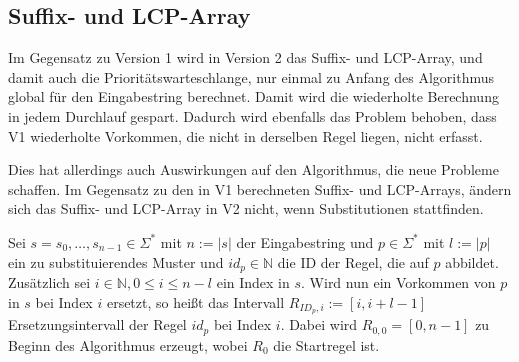 \subsection{Suffix- und LCP-Array}
Im Gegensatz zu Version 1 wird in Version 2 das Suffix- und LCP-Array, und damit auch die Prioritätswarteschlange, nur einmal zu Anfang des Algorithmus global für den Eingabestring berechnet. Damit wird die wiederholte Berechnung in jedem Durchlauf gespart. 
Dadurch wird ebenfalls das Problem behoben, dass V1 wiederholte Vorkommen, die nicht in derselben Regel liegen, nicht erfasst.

Dies hat allerdings auch Auswirkungen auf den Algorithmus, die neue Probleme schaffen. Im Gegensatz zu den in V1 berechneten Suffix- und LCP-Arrays, ändern sich das Suffix- und LCP-Array in V2 nicht, wenn Substitutionen stattfinden. 

Sei $s = s_0, \dots, s_{n-1} \in \Sigma^*$ mit $n := |s|$ der Eingabestring und $p \in \Sigma^*$ mit $l := |p|$  ein zu substituierendes Muster und $id_p \in \mathbb{N}$ die ID der Regel, die auf $p$ abbildet. Zusätzlich sei $i \in \mathbb{N}, 0 \leq i \leq n - l$ ein Index in $s$. Wird nun ein Vorkommen von $p$ in $s$ bei Index $i$ ersetzt, so heißt das Intervall $R_{ID_p, i} := [i, i + l - 1]$ Ersetzungsintervall der Regel $id_p$ bei Index $i$. Dabei wird $R_{0, 0} = [0, n-1]$ zu Beginn des Algorithmus erzeugt, wobei $R_0$ die Startregel ist. \\

